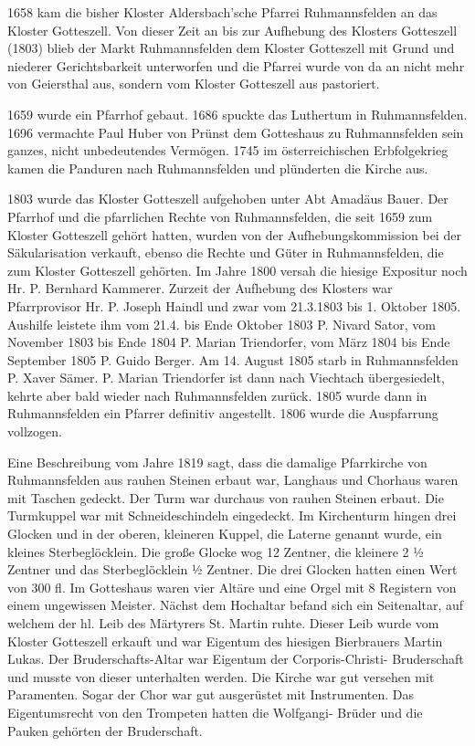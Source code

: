 \documentclass[12pt,a4paper]{book}
\begin{document}
1658 kam die bisher Kloster Aldersbach'sche Pfarrei Ruhmannsfelden an
das Kloster Gotteszell. Von dieser Zeit an bis zur Aufhebung des
Klosters Gotteszell (1803) blieb der Markt Ruhmannsfelden dem Kloster
Gotteszell mit Grund und niederer Gerichtsbarkeit unterworfen und die
Pfarrei wurde von da an nicht mehr von Geiersthal aus, sondern vom
Kloster Gotteszell aus pastoriert.

1659 wurde ein Pfarrhof gebaut. 1686 spuckte das Luthertum in
Ruhmannsfelden. 1696 vermachte Paul Huber von Prünst dem Gotteshaus zu
Ruhmannsfelden sein ganzes, nicht unbedeutendes Vermögen. 1745 im
österreichischen Erbfolgekrieg kamen die Panduren nach Ruhmannsfelden
und plünderten die Kirche aus.

1803 wurde das Kloster Gotteszell aufgehoben unter Abt Amadäus Bauer.
Der Pfarrhof und die pfarrlichen Rechte von Ruhmannsfelden, die seit
1659 zum Kloster Gotteszell gehört hatten, wurden von der
Aufhebungskommission bei der Säkularisation verkauft, ebenso die Rechte
und Güter in Ruhmannsfelden, die zum Kloster Gotteszell gehörten. Im
Jahre 1800 versah die hiesige Expositur noch Hr. P. Bernhard Kammerer.
Zurzeit der Aufhebung des Klosters war Pfarrprovisor Hr. P. Joseph
Haindl und zwar vom 21.3.1803 bis 1. Oktober 1805. Aushilfe leistete ihm
vom 21.4. bis Ende Oktober 1803 P. Nivard Sator, vom November 1803 bis
Ende 1804 P. Marian Triendorfer, vom März 1804 bis Ende September 1805
P. Guido Berger. Am 14. August 1805 starb in Ruhmannsfelden P. Xaver
Sämer. P. Marian Triendorfer ist dann nach Viechtach übergesiedelt,
kehrte aber bald wieder nach Ruhmannsfelden zurück. 1805 wurde dann in
Ruhmannsfelden ein Pfarrer definitiv angestellt. 1806 wurde die
Auspfarrung vollzogen.

Eine Beschreibung vom Jahre 1819 sagt, dass die damalige Pfarrkirche von
Ruhmannsfelden aus rauhen Steinen erbaut war, Langhaus und Chorhaus
waren mit Taschen gedeckt. Der Turm war durchaus von rauhen Steinen
erbaut. Die Turmkuppel war mit Schneideschindeln eingedeckt. Im
Kirchenturm hingen drei Glocken und in der oberen, kleineren Kuppel, die
Laterne genannt wurde, ein kleines Sterbeglöcklein. Die große Glocke wog
12 Zentner, die kleinere 2 ½  Zentner und das Sterbeglöcklein ½
Zentner. Die drei Glocken hatten einen Wert von 300 fl. Im Gotteshaus
waren vier Altäre und eine Orgel mit 8 Registern von einem ungewissen
Meister. Nächst dem Hochaltar befand sich ein Seitenaltar, auf welchem
der hl. Leib des Märtyrers St. Martin ruhte. Dieser Leib wurde vom
Kloster Gotteszell erkauft und war Eigentum des hiesigen Bierbrauers
Martin Lukas. Der Bruderschafts-Altar war Eigentum der Corporis-Christi-
Bruderschaft und musste von dieser unterhalten werden. Die Kirche war
gut versehen mit Paramenten. Sogar der Chor war gut ausgerüstet mit
Instrumenten. Das Eigentumsrecht von den Trompeten hatten die Wolfgangi-
Brüder und die Pauken gehörten der Bruderschaft.
\end{document}
